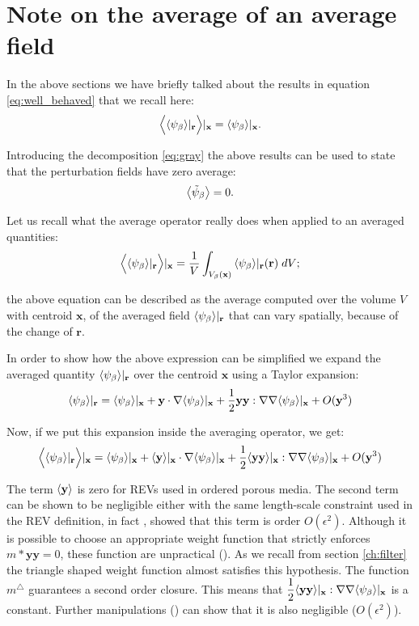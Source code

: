 \section{Note on the average of an average field}
\label{ch:appendix_a}

In the above sections we have briefly talked about the results in equation \eqref{eq:well_behaved} that we recall here:
$$\Big<{\left< \psi_{\beta} \right>}|_{\mathbf{r}} \Big>|_{\mathbf{x}} = {\left< \psi_{\beta} \right>}|_{\mathbf{x}}.$$

\noindent Introducing the decomposition \eqref{eq:gray} the above results can be used to state that the perturbation fields have zero average:
$$  {\left< \tilde{\psi}_{\beta} \right>} = 0.$$

\noindent Let us recall what the average operator really does when applied to an averaged quantities:
$$  \Big< {\left< \psi_{\beta} \right>}|_{\mathbf{r}} \Big>|_{\mathbf{x}}  = \dfrac{1}{V} \int_{V_\beta(\mathbf{x})} {\left< \psi_{\beta} \right>}|_{\mathbf{r}}(\mathbf{r}) \; dV; $$

\noindent the above equation can be described as the average computed over the volume $V$ with centroid $\mathbf{x}$, of the averaged field ${\left< \psi_{\beta} \right>}|_{\mathbf{r}}$ that can vary spatially, because of the change of $\mathbf{r}$.

In order to show how the above expression can be simplified we expand the averaged quantity ${\left< \psi_{\beta} \right>}|_{\mathbf{r}}$ over the centroid $\mathbf{x}$ using a Taylor expansion:
$$
{\left< \psi_{\beta} \right>}|_{\mathbf{r}} = {\left< \psi_{\beta} \right>}|_{\mathbf{x}} + \mathbf{y} \cdot \nabla {\left< \psi_{\beta} \right>}|_{\mathbf{x}} + \dfrac{1}{2} \mathbf{y}\mathbf{y} :  \nabla \nabla {\left< \psi_{\beta} \right>}|_{\mathbf{x}} + O(\mathbf{y}^3)
$$

Now, if we put this expansion inside the averaging operator, we get:
$$
\Big< {\left< \psi_{\beta} \right>}|_{\mathbf{r}} \Big>|_{\mathbf{x}} = {\left< \psi_{\beta} \right>}|_{\mathbf{x}} + {\left< \mathbf{y} \right>}|_{\mathbf{x}} \cdot \nabla {\left< \psi_{\beta} \right>}|_{\mathbf{x}} + \dfrac{1}{2} {\left< \mathbf{y}\mathbf{y} \right>}|_{\mathbf{x}} :  \nabla \nabla {\left< \psi_{\beta} \right>}|_{\mathbf{x}} + O(\mathbf{y}^3)
$$

The term ${\left< \mathbf{y} \right>}$ is zero for REVs used in ordered porous media.
The second term can be shown to be negligible either with the same length-scale constraint used in the REV definition, in fact \citet{ochoa1995momentum}, \citet{paez2017macroscopic} showed that this term is order $O(\epsilon^2)$.
Although it is possible to choose an appropriate weight function that strictly enforces $m*\mathbf{y}\mathbf{y} =0$, these function are unpractical (\citet{davit2017technical}).
As we recall from section \ref{ch:filter} the triangle shaped weight function almost satisfies this hypothesis. The function $m^{\triangle}$ guarantees a second order closure. This means that $\dfrac{1}{2} {\left< \mathbf{y}\mathbf{y} \right>}|_{\mathbf{x}} :  \nabla \nabla {\left< \psi_{\beta} \right>}|_{\mathbf{x}}$ is a constant. Further manipulations (\cite{davit2017technical}) can show that it is also negligible ($O(\epsilon^2)$).

